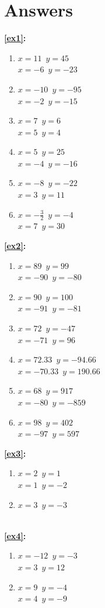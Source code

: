 \documentclass[a4paper,11pt]{article}
\begin{document}
\section{Answers}
\begin{multicols}{3}
\textbf{\ref{ex1}:}
\begin{enumerate}
\item $x=11$~$y=45$\\$x=-6$~$y=-23$
\item $x=-10$~$y=-95$\\$x=-2$~$y=-15$
\item $x=7$~$y=6$\\$x=5$~$y=4$
\item $x=5$~$y=25$\\$x=-4$~$y=-16$
\item $x=-8$~$y=-22$\\$x=3$~$y=11$
\item $x=-\frac{3}{2}$~$y=-4$\\$x=7$~$y=30$
\end{enumerate}
\textbf{\ref{ex2}:}
\begin{enumerate}
\item $x=89$~$y=99$\\$x=-90$~$y=-80$
\item $x=90$~$y=100$\\$x=-91$~$y=-81$
\item $x=72$~$y=-47$\\$x=-71$~$y=96$
\item $x=72.33$~$y=-94.66$\\$x=-70.33$~$y=190.66$
\item $x=68$~$y=917$\\$x=-80$~$y=-859$
\item $x=98$~$y=402$\\$x=-97$~$y=597$
\end{enumerate}
\textbf{\ref{ex3}:}
\begin{enumerate}
\item $x=2$~$y=1$\\$x=1$~$y=-2$
\item $x=3$~$y=-3$\\\\
\end{enumerate}
\textbf{\ref{ex4}:}
\begin{enumerate}
\item $x=-12$~$y=-3$\\$x=3$~$y=12$
\item $x=9$~$y=-4$\\$x=4$~$y=-9$

\end{enumerate}
\end{multicols}
\end{document}
